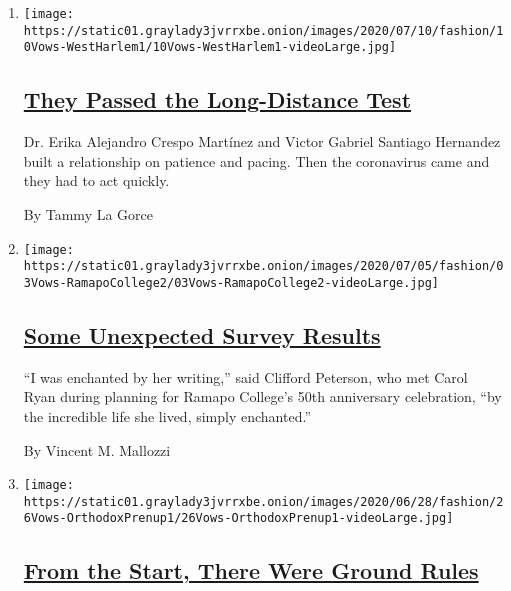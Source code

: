 \begin{enumerate}
\def\labelenumi{\arabic{enumi}.}
\item
  \texttt{[image: https://static01.graylady3jvrrxbe.onion/images/2020/07/10/fashion/10Vows-WestHarlem1/10Vows-WestHarlem1-videoLarge.jpg]}

  \hypertarget{they-passed-the-long-distance-test}{%
  \subsection{\texorpdfstring{\href{/2020/07/10/fashion/weddings/they-passed-the-long-distance-test.html}{They
  Passed the Long-Distance
  Test}}{They Passed the Long-Distance Test}}\label{they-passed-the-long-distance-test}}

  Dr. Erika Alejandro Crespo Martínez and Victor Gabriel Santiago
  Hernandez built a relationship on patience and pacing. Then the
  coronavirus came and they had to act quickly.

  By Tammy La Gorce
\item
  \texttt{[image: https://static01.graylady3jvrrxbe.onion/images/2020/07/05/fashion/03Vows-RamapoCollege2/03Vows-RamapoCollege2-videoLarge.jpg]}

  \hypertarget{some-unexpected-survey-results}{%
  \subsection{\texorpdfstring{\href{/2020/07/03/fashion/weddings/some-unexpected-survey-results.html}{Some
  Unexpected Survey
  Results}}{Some Unexpected Survey Results}}\label{some-unexpected-survey-results}}

  ``I was enchanted by her writing,'' said Clifford Peterson, who met
  Carol Ryan during planning for Ramapo College's 50th anniversary
  celebration, ``by the incredible life she lived, simply enchanted.''

  By Vincent M. Mallozzi
\item
  \texttt{[image: https://static01.graylady3jvrrxbe.onion/images/2020/06/28/fashion/26Vows-OrthodoxPrenup1/26Vows-OrthodoxPrenup1-videoLarge.jpg]}

  \hypertarget{from-the-start-there-were-ground-rules}{%
  \subsection{\texorpdfstring{\href{/2020/06/26/fashion/weddings/from-the-start-there-were-ground-rules.html}{From
  the Start, There Were Ground
  Rules}}{From the Start, There Were Ground Rules}}\label{from-the-start-there-were-ground-rules}}


\end{enumerate}
